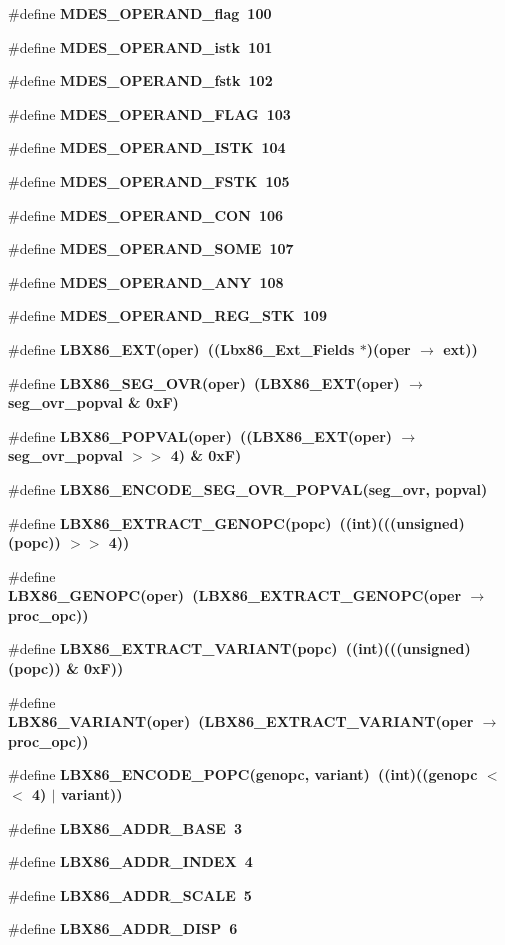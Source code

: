 \begin{CompactItemize}
\item 
\#define \bf{MDES\_\-OPERAND\_\-flag}~100
\item 
\#define \bf{MDES\_\-OPERAND\_\-istk}~101
\item 
\#define \bf{MDES\_\-OPERAND\_\-fstk}~102
\item 
\#define \bf{MDES\_\-OPERAND\_\-FLAG}~103
\item 
\#define \bf{MDES\_\-OPERAND\_\-ISTK}~104
\item 
\#define \bf{MDES\_\-OPERAND\_\-FSTK}~105
\item 
\#define \bf{MDES\_\-OPERAND\_\-CON}~106
\item 
\#define \bf{MDES\_\-OPERAND\_\-SOME}~107
\item 
\#define \bf{MDES\_\-OPERAND\_\-ANY}~108
\item 
\#define \bf{MDES\_\-OPERAND\_\-REG\_\-STK}~109
\item 
\#define \bf{LBX86\_\-EXT}(oper)~((\bf{Lbx86\_\-Ext\_\-Fields} $\ast$)(oper $\rightarrow$ ext))
\item 
\#define \bf{LBX86\_\-SEG\_\-OVR}(oper)~(LBX86\_\-EXT(oper) $\rightarrow$ seg\_\-ovr\_\-popval \& 0x\-F)
\item 
\#define \bf{LBX86\_\-POPVAL}(oper)~((LBX86\_\-EXT(oper) $\rightarrow$ seg\_\-ovr\_\-popval $>$$>$ 4) \& 0x\-F)
\item 
\#define \bf{LBX86\_\-ENCODE\_\-SEG\_\-OVR\_\-POPVAL}(seg\_\-ovr, popval)
\item 
\#define \bf{LBX86\_\-EXTRACT\_\-GENOPC}(popc)~((int)(((unsigned)(popc)) $>$$>$ 4))
\item 
\#define \bf{LBX86\_\-GENOPC}(oper)~(LBX86\_\-EXTRACT\_\-GENOPC(oper $\rightarrow$ proc\_\-opc))
\item 
\#define \bf{LBX86\_\-EXTRACT\_\-VARIANT}(popc)~((int)(((unsigned)(popc)) \& 0x\-F))
\item 
\#define \bf{LBX86\_\-VARIANT}(oper)~(LBX86\_\-EXTRACT\_\-VARIANT(oper $\rightarrow$ proc\_\-opc))
\item 
\#define \bf{LBX86\_\-ENCODE\_\-POPC}(genopc, variant)~((int)((genopc $<$$<$ 4) $|$ variant))
\item 
\#define \bf{LBX86\_\-ADDR\_\-BASE}~3
\item 
\#define \bf{LBX86\_\-ADDR\_\-INDEX}~4
\item 
\#define \bf{LBX86\_\-ADDR\_\-SCALE}~5
\item 
\#define \bf{LBX86\_\-ADDR\_\-DISP}~6
\end{CompactItemize}
